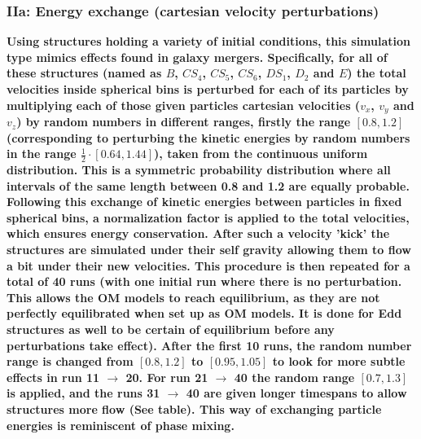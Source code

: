 \subsubsection{IIa: Energy exchange (cartesian velocity perturbations)}
\textbf{Using structures holding a variety of initial conditions, this simulation type mimics effects found in galaxy mergers. Specifically, for all of these structures (named as $B$, $CS_4$, $CS_5$, $CS_6$, $DS_1$, $D_2$ and $E$) the total velocities inside spherical bins is perturbed for each of its particles by multiplying each of those given particles cartesian velocities ($v_x$, $v_y$ and $v_z$) by random numbers in different ranges, firstly the range $[0.8, 1.2]$ (corresponding to perturbing the kinetic energies by random numbers in the range $\frac{1}{2}\cdot[0.64, 1.44]$), taken from the continuous uniform distribution. This is a symmetric probability distribution where all intervals of the same length between 0.8 and 1.2 are equally probable. Following this exchange of kinetic energies between particles in fixed spherical bins, a normalization factor is applied to the total velocities, which ensures energy conservation. After such a velocity 'kick' the structures are simulated under their self gravity allowing them to flow a bit under their new velocities. This procedure is then repeated for a total of 40 runs (with one initial run where there is no perturbation. This allows the OM models to reach equilibrium, as they are not perfectly equilibrated when set up as OM models. It is done for Edd structures as well to be certain of equilibrium before any perturbations take effect). After the first 10 runs, the random number range is changed from $[0.8, 1.2]$ to $[0.95, 1.05]$ to look for more subtle effects in run 11 $\rightarrow$ 20. For run 21 $\rightarrow$ 40 the random range $[0.7, 1.3]$ is applied, and the runs 31 $\rightarrow$ 40 are given longer timespans to allow structures more flow (See table). This way of exchanging particle energies is reminiscent of phase mixing.} \\ \\

